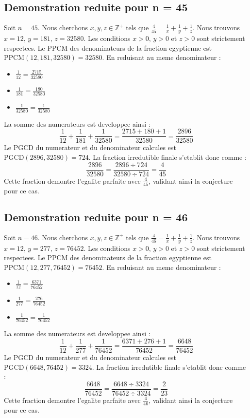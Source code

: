 \documentclass[11pt,a4paper]{article}
\begin{document}
\subsection{Demonstration reduite pour n = 45}
Soit $n = 45$. Nous cherchons $x, y, z \in \mathbb{Z}^{+}$ tels que $\frac{4}{45} = \frac{1}{x} + \frac{1}{y} + \frac{1}{z}$.
Nous trouvons $x = 12$, $y = 181$, $z = 32580$.
Les conditions $x > 0$, $y > 0$ et $z > 0$ sont strictement respectees.
Le PPCM des denominateurs de la fraction egyptienne est $\text{PPCM}(12, 181, 32580) = 32580$.
En reduisant au meme denominateur :
\begin{itemize}
    \item $\frac{1}{12} = \frac{2715}{32580}$
    \item $\frac{1}{181} = \frac{180}{32580}$
    \item $\frac{1}{32580} = \frac{1}{32580}$
\end{itemize}
La somme des numerateurs est developpee ainsi :
$$ \frac{1}{12} + \frac{1}{181} + \frac{1}{32580} = \frac{2715 + 180 + 1}{32580} = \frac{2896}{32580} $$
Le PGCD du numerateur et du denominateur calcules est $\text{PGCD}(2896, 32580) = 724$.
La fraction irredutible finale s'etablit donc comme :
$$ \frac{2896}{32580} = \frac{2896 \div 724}{32580 \div 724} = \frac{4}{45} $$
Cette fraction demontre l'egalite parfaite avec $\frac{4}{45}$, validant ainsi la conjecture pour ce cas.

\subsection{Demonstration reduite pour n = 46}
Soit $n = 46$. Nous cherchons $x, y, z \in \mathbb{Z}^{+}$ tels que $\frac{4}{46} = \frac{1}{x} + \frac{1}{y} + \frac{1}{z}$.
Nous trouvons $x = 12$, $y = 277$, $z = 76452$.
Les conditions $x > 0$, $y > 0$ et $z > 0$ sont strictement respectees.
Le PPCM des denominateurs de la fraction egyptienne est $\text{PPCM}(12, 277, 76452) = 76452$.
En reduisant au meme denominateur :
\begin{itemize}
    \item $\frac{1}{12} = \frac{6371}{76452}$
    \item $\frac{1}{277} = \frac{276}{76452}$
    \item $\frac{1}{76452} = \frac{1}{76452}$
\end{itemize}
La somme des numerateurs est developpee ainsi :
$$ \frac{1}{12} + \frac{1}{277} + \frac{1}{76452} = \frac{6371 + 276 + 1}{76452} = \frac{6648}{76452} $$
Le PGCD du numerateur et du denominateur calcules est $\text{PGCD}(6648, 76452) = 3324$.
La fraction irredutible finale s'etablit donc comme :
$$ \frac{6648}{76452} = \frac{6648 \div 3324}{76452 \div 3324} = \frac{2}{23} $$
Cette fraction demontre l'egalite parfaite avec $\frac{4}{46}$, validant ainsi la conjecture pour ce cas.
\end{document}
